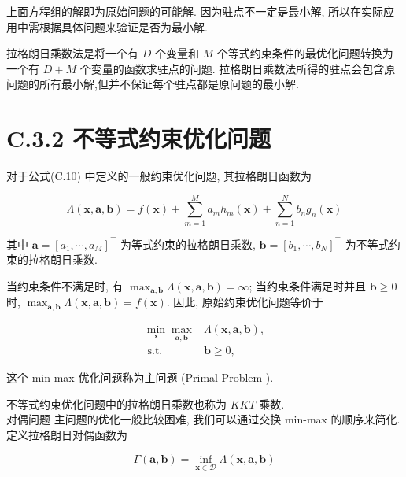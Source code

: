 \documentclass[10pt]{article}
\begin{document}
上面方程组的解即为原始问题的可能解. 因为驻点不一定是最小解, 所以在实际应用中需根据具体问题来验证是否为最小解.

拉格朗日乘数法是将一个有 $D$ 个变量和 $M$ 个等式约束条件的最优化问题转换为一个有 $D+M$ 个变量的函数求驻点的问题. 拉格朗日乘数法所得的驻点会包含原问题的所有最小解,但并不保证每个驻点都是原问题的最小解.

\section*{C.3.2 不等式约束优化问题}
对于公式(C.10) 中定义的一般约束优化问题, 其拉格朗日函数为


\begin{equation*}
\Lambda(\boldsymbol{x}, \boldsymbol{a}, \boldsymbol{b})=f(\boldsymbol{x})+\sum_{m=1}^{M} a_{m} h_{m}(\boldsymbol{x})+\sum_{n=1}^{N} b_{n} g_{n}(\boldsymbol{x}) \tag{C.15}
\end{equation*}


其中 $\boldsymbol{a}=\left[a_{1}, \cdots, a_{M}\right]^{\top}$ 为等式约束的拉格朗日乘数, $\boldsymbol{b}=\left[b_{1}, \cdots, b_{N}\right]^{\top}$ 为不等式约束的拉格朗日乘数.

当约束条件不满足时, 有 $\max _{\boldsymbol{a}, \boldsymbol{b}} \Lambda(\boldsymbol{x}, \boldsymbol{a}, \boldsymbol{b})=\infty$; 当约束条件满足时并且 $\boldsymbol{b} \geq 0$ 时, $\max _{\boldsymbol{a}, \boldsymbol{b}} \Lambda(\boldsymbol{x}, \boldsymbol{a}, \boldsymbol{b})=f(\boldsymbol{x})$. 因此, 原始约束优化问题等价于


\begin{align*}
\min _{\boldsymbol{x}} \max _{\boldsymbol{a}, \boldsymbol{b}} & \Lambda(\boldsymbol{x}, \boldsymbol{a}, \boldsymbol{b}),  \tag{C.16}\\
\text { s.t. } & \boldsymbol{b} \geq 0, \tag{C.17}
\end{align*}


这个 min-max 优化问题称为主问题 (Primal Problem ).

不等式约束优化问题中的拉格朗日乘数也称为 $K K T$ 乘数.\\
对偶问题 主问题的优化一般比较困难, 我们可以通过交换 min-max 的顺序来简化. 定义拉格朗日对偶函数为


\begin{equation*}
\Gamma(\boldsymbol{a}, \boldsymbol{b})=\inf _{\boldsymbol{x} \in \mathcal{D}} \Lambda(\boldsymbol{x}, \boldsymbol{a}, \boldsymbol{b}) \tag{C.18}
\end{equation*}
\end{document}
